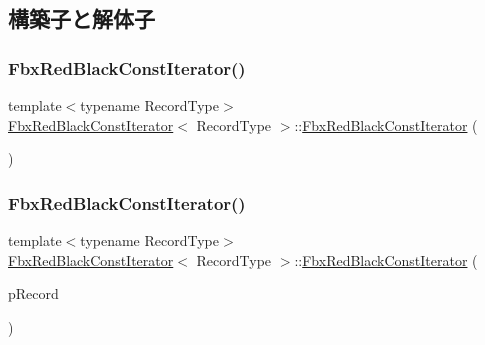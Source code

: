 \subsection{構築子と解体子}
\mbox{\label{class_fbx_red_black_const_iterator_a440804a78f8ea8a535a92187afa5ae77}} 
\subsubsection{\texorpdfstring{Fbx\+Red\+Black\+Const\+Iterator()}{FbxRedBlackConstIterator()}\hspace{0.1cm}{\footnotesize\ttfamily [1/4]}}
{\footnotesize\ttfamily template$<$typename Record\+Type$>$ \\
\hyperlink{class_fbx_red_black_const_iterator}{Fbx\+Red\+Black\+Const\+Iterator}$<$ Record\+Type $>$\+::\hyperlink{class_fbx_red_black_const_iterator}{Fbx\+Red\+Black\+Const\+Iterator} (\begin{DoxyParamCaption}{ }\end{DoxyParamCaption})}

\mbox{\label{class_fbx_red_black_const_iterator_a175bfbcab9178cd3a5c32430db793d50}} 
\subsubsection{\texorpdfstring{Fbx\+Red\+Black\+Const\+Iterator()}{FbxRedBlackConstIterator()}\hspace{0.1cm}{\footnotesize\ttfamily [2/4]}}
{\footnotesize\ttfamily template$<$typename Record\+Type$>$ \\
\hyperlink{class_fbx_red_black_const_iterator}{Fbx\+Red\+Black\+Const\+Iterator}$<$ Record\+Type $>$\+::\hyperlink{class_fbx_red_black_const_iterator}{Fbx\+Red\+Black\+Const\+Iterator} (\begin{DoxyParamCaption}\item[{const Record\+Type $\ast$}]{p\+Record }\end{DoxyParamCaption})}

